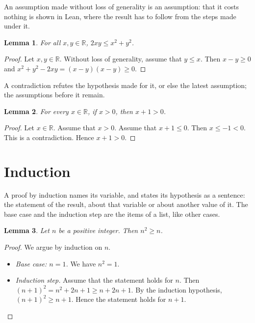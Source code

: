 \documentclass{article}
\newtheorem{lemma}{Lemma}
\begin{document}
An assumption made without loss of generality is an assumption: that it costs nothing is shown in Lean, where the result has to follow from the steps made under it.

\begin{lemma}\label{lem:wlog}
For all $x,y\in\mathbb{R}$, $2xy\le x^2+y^2$.
\end{lemma}

\begin{proof}
Let $x,y\in\mathbb{R}$.
Without loss of generality, assume that $y\le x$.
Then $x-y\ge0$ and $x^2+y^2-2xy=(x-y)(x-y)\ge0$.
\end{proof}

A contradiction refutes the hypothesis made for it, or else the latest assumption; the assumptions before it remain.

\begin{lemma}\label{lem:which}
For every $x\in\mathbb{R}$, if $x>0$, then $x+1>0$.
\end{lemma}

\begin{proof}
Let $x\in\mathbb{R}$.
Assume that $x>0$.
Assume that $x+1\le0$.
Then $x\le-1<0$.
This is a contradiction.
Hence $x+1>0$.
\end{proof}

\section{Induction}

A proof by induction names its variable, and states its hypothesis as a sentence: the statement of the result, about that variable or about another value of it.
The base case and the induction step are the items of a list, like other cases.

\begin{lemma}\label{lem:induction}
Let $n$ be a positive integer.
Then $n^2\ge n$.
\end{lemma}

\begin{proof}
We argue by induction on $n$.
\begin{itemize}
\item \emph{Base case: $n=1$.} We have $n^2=1$.
\item \emph{Induction step.} Assume that the statement holds for $n$.
Then $(n+1)^2=n^2+2n+1\ge n+2n+1$.
By the induction hypothesis, $(n+1)^2\ge n+1$.
Hence the statement holds for $n+1$.
\end{itemize}
\end{proof}
\end{document}
